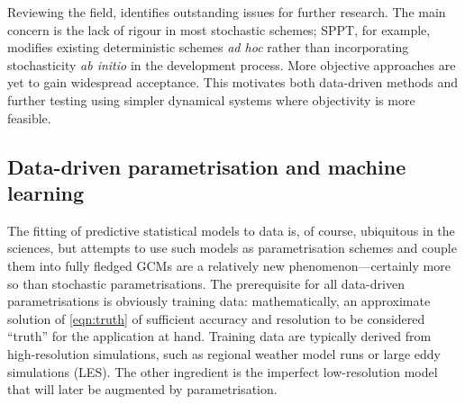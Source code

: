 \documentclass[titlepage,twoside]{article}
\numberwithin{equation}{section}
\begin{document}
Reviewing the field, \textcite{palmer2019} identifies outstanding issues for
further research. The main concern is the lack of rigour in most stochastic
schemes; SPPT, for example, modifies existing deterministic schemes \emph{ad
hoc} rather than incorporating stochasticity \emph{ab initio} in the
development process. More objective approaches are yet to gain widespread
acceptance. This motivates both data-driven methods and further testing
using simpler dynamical systems where objectivity is more feasible.


\subsection{Data-driven parametrisation and machine learning}
The fitting of predictive statistical models to data is, of course, ubiquitous
in the sciences, but attempts to use such models as parametrisation schemes and
couple them into fully fledged GCMs are a relatively new phenomenon---certainly
more so than stochastic parametrisations. The prerequisite for all data-driven
parametrisations is obviously training data: mathematically, an approximate
solution of \cref{eqn:truth} of sufficient accuracy and resolution to be
considered ``truth'' for the application at hand. Training data are typically
derived from high-resolution simulations, such as regional weather model runs
or large eddy simulations (LES). The other ingredient is the imperfect
low-resolution model that will later be augmented by parametrisation.
\end{document}
